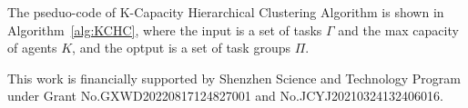 \documentclass[sigconf,anonymous]{aamas}
\begin{document}
The pseduo-code of K-Capacity Hierarchical Clustering Algorithm is shown in Algorithm~\ref{alg:KCHC},
where the input is a set of tasks $\Gamma$ and the max capacity of agents $K$,
and the optput is a set of task groups $\Pi$.


\balance



\begin{acks}
  This work is financially supported by Shenzhen Science and Technology Program 
  under Grant No.GXWD20220817124827001 and No.JCYJ20210324132406016.
\end{acks}



 


\end{document}
